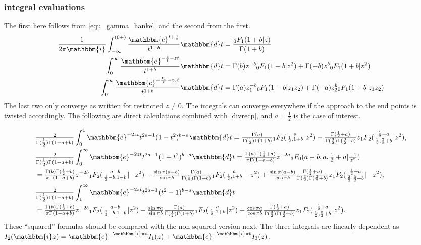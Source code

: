 \documentclass[12pt]{article}
\newcommand{\ee}[0] {\mathbbm{e}}
\newcommand{\ii}[0] {\mathbbm{i}}
\newcommand{\dd}[0] {\mathbbm{d}}
\numberwithin{equation}{section}
\newcommand{\FFs}[6] {{}_{#1}{#2}_{#3} ( \begin{smallmatrix} #4 \\ #5 \end{smallmatrix} | {#6}  )}
\begin{document}
\subsubsection{integral evaluations}
The first here follows from \eqref{equ_gamma_hankel} and the second from the first.
\begin{align*}
\frac{1}{2\pi \ii} \int_{-\infty}^{(0+)} \frac{\ee^{t + \frac{z}{t}}}{t^{1+b}} \dd t &= \frac{{}_0 F_{1} (1+b|z)}{\Gamma(1+b)}\\
\int_{0}^{\infty} \frac{\ee^{-\frac{z}{t} - z t}}{t^{1+b}} \dd t & = \Gamma(b) z^{-b} {}_0 F_{1} (1-b|z^2) + \Gamma(-b) z^{b} {}_0 F_{1} (1+b|z^2) \\
\int_{0}^{\infty} \frac{\ee^{-\frac{z_1}{t} - z_2 t}}{t^{1+b}} \dd t & = \Gamma(a) z_1^{-b} {}_0 F_{1} (1-b|z_1 z_2) + \Gamma(-a) z_2^{b} {}_0 F_{1} (1+b| z_1 z_2)
\end{align*}
The last two only converge as written for restricted $z \ne 0$. The integrals can converge everywhere if the approach to the end points is twisted accordingly. The following are direct calculations combined with \eqref{divrecp}, and $a=\frac12$ is the case of interest.

\newcommand{\soltwo}[1] {\tfrac{\Gamma(b)\Gamma(\frac12+b)}{\pi \Gamma(1-a+b)} z^{-2b} \FFs{1}{F}{2}{a-b}{\frac12-b,1-b}{#1}}

\newcommand{\solzero}[1] {\tfrac{\Gamma(a)}{\Gamma(\frac12) \Gamma(1+b)} \FFs{1}{F}{2}{a}{\frac12,1+b}{#1}}

\newcommand{\solone}[1] {\tfrac{\Gamma(\frac12+a)}{\Gamma(\frac32) \Gamma(\frac32 + b)} z \FFs{1}{F}{2}{\frac12+a}{\frac32, \frac32+b}{#1}}

\begin{align*}
&\tfrac{2}{\Gamma(\tfrac12) \Gamma(1-a+b)} \int_0^1 \ee^{-2 z t} t^{2a-1} (1-t^2)^{b-a} \dd t = \solzero{z^2} - \solone{z^2}\text{,}\\
&\tfrac{2}{\Gamma(\tfrac12) \Gamma(1-a+b)} \int_0^{\infty} \ee^{-2 z t} t^{2a-1} (1+t^2)^{b-a} \dd t = \tfrac{\Gamma(a)\Gamma(\frac12+a)}{\pi \Gamma(1-a+b)} z^{-2a} {}_3 F_0(a-b,a,\tfrac12+a|\tfrac{-1}{z^2})\\
 &= \soltwo{-z^2} - \tfrac{\sin \pi (a-b)}{\sin \pi b} \solzero{-z^2} + \tfrac{\sin \pi (a-b)}{\cos \pi b} \solone{-z^2}\text{,}\\
 &\tfrac{2}{\Gamma(\tfrac12) \Gamma(1-a+b)} \int_1^{\infty} \ee^{-2 z t} t^{2a-1} (t^2-1)^{b-a} \dd t\\ 
&= \soltwo{z^2} - \tfrac{\sin \pi a}{\sin \pi b} \solzero{z^2} + \tfrac{\cos \pi a}{\cos \pi b} \solone{z^2}\text{.}
\end{align*}
\let\soltwo\undefined
\let\solone\undefined
\let\solzero\undefined
These ``squared'' formulas should be compared with the non-squared version next. The three integrals are linearly dependent as $I_2(\ii z) = \ee^{-\ii \pi a } I_1(z) + \ee^{-\ii \pi b} I_3(z)$.
\end{document}
